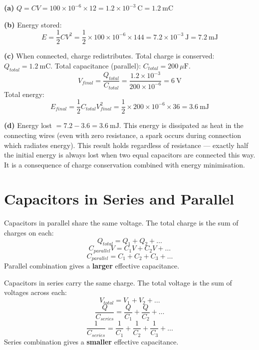 \begin{solutionbox}
\textbf{(a)} $Q = CV = 100\times10^{-6} \times 12
= 1.2\times10^{-3}\ \text{C} = 1.2\ \text{mC}$

\textbf{(b)} Energy stored:
\[
  E = \frac{1}{2}CV^2 = \frac{1}{2}
  \times 100\times10^{-6} \times 144
  = 7.2\times10^{-3}\ \text{J} = 7.2\ \text{mJ}
\]

\textbf{(c)} When connected, charge redistributes.
Total charge is conserved:
$Q_{total} = 1.2\ \text{mC}$.
Total capacitance (parallel): $C_{total} = 200\ \mu\text{F}$.
\[
  V_{final} = \frac{Q_{total}}{C_{total}}
  = \frac{1.2\times10^{-3}}{200\times10^{-6}}
  = 6\ \text{V}
\]
Total energy:
\[
  E_{final} = \frac{1}{2}C_{total}V_{final}^2
  = \frac{1}{2} \times 200\times10^{-6} \times 36
  = 3.6\ \text{mJ}
\]

\textbf{(d)} Energy lost $= 7.2 - 3.6 = 3.6\ \text{mJ}$.
This energy is dissipated as heat in the connecting
wires (even with zero resistance, a spark occurs
during connection which radiates energy). This
result holds regardless of resistance --- exactly
half the initial energy is always lost when two
equal capacitors are connected this way. It is a
consequence of charge conservation combined with
energy minimisation.
\end{solutionbox}

\section{Capacitors in Series and Parallel}

\begin{lawbox}
Capacitors in parallel share the same voltage.
The total charge is the sum of charges on each:
\[
  Q_{total} = Q_1 + Q_2 + \ldots
\]
\[
  C_{parallel}V = C_1V + C_2V + \ldots
\]
\[
  \boxed{C_{parallel} = C_1 + C_2 + C_3 + \ldots}
\]
Parallel combination gives a \textbf{larger}
effective capacitance.
\end{lawbox}

\begin{lawbox}
Capacitors in series carry the same charge.
The total voltage is the sum of voltages across each:
\[
  V_{total} = V_1 + V_2 + \ldots
\]
\[
  \frac{Q}{C_{series}} = \frac{Q}{C_1}
  + \frac{Q}{C_2} + \ldots
\]
\[
  \boxed{\frac{1}{C_{series}}
  = \frac{1}{C_1} + \frac{1}{C_2} + \frac{1}{C_3}
  + \ldots}
\]
Series combination gives a \textbf{smaller}
effective capacitance.
\end{lawbox}

